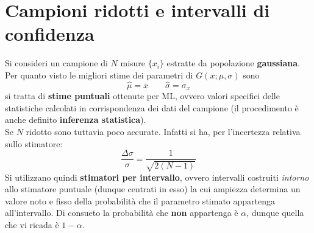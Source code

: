 \documentclass[10pt, oneside]{book}
\begin{document}
\chapter{Campioni ridotti e intervalli di confidenza}
Si consideri un campione di $N$ misure $\{x_i\}$ estratte da popolazione \textbf{gaussiana}. Per quanto visto le migliori stime dei parametri di $G(x; \mu, \sigma)$ sono
\[\hat{\mu} = \overline{x} \qquad \hat{\sigma} = \sigma_x\]
si tratta di \textbf{stime puntuali} ottenute per ML, ovvero valori specifici delle statistiche calcolati in corrispondenza dei dati del campione (il procedimento è anche definito \textbf{inferenza statistica}).\\
Se $N$ ridotto sono tuttavia poco accurate. Infatti si ha, per l'incertezza relativa sullo stimatore:
\[\frac{\Delta \sigma}{\sigma} = \frac{1}{\sqrt{2(N-1)}}\]
Si utilizzano quindi \textbf{stimatori per intervallo}, ovvero intervalli costruiti \textit{intorno} allo stimatore puntuale (dunque centrati in esso) la cui ampiezza determina un valore noto e fisso della probabilità che il parametro stimato appartenga all'intervallo. Di consueto la probabilità che \textbf{non} appartenga è $\alpha$, dunque quella che vi ricada è $1-\alpha$.
\end{document}
